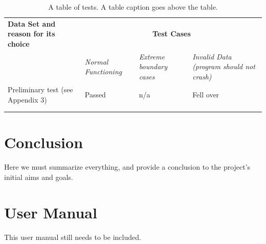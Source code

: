 \documentclass[11pt,a4paper]{article}
\begin{document}
\begin{table}[h!]
    \centering
    \begin{tabular}[t]{|p{5.5cm}|p{3cm}|p{3cm}|p{3cm}|} \hline \textbf{Data Set
        and reason for its choice} & \multicolumn{3}{c|}{\textbf{Test Cases}}\\
        \cline{2-4} & \emph{Normal Functioning} & \emph{Extreme boundary cases} &
        \emph{Invalid Data (program should not crash)} \\ \hline Preliminary test
        (see Appendix 3) & Passed & n/a & Fell over \\\hline &&&\\ \hline
                         &&&\\ \hline
    \end{tabular}
    \caption{A table of tests. A table caption goes above the table.}
    \label{tab:tests}
\end{table}

\section{Conclusion}
\label{s:conclusion}
Here we must summarize everything, and provide a conclusion to the project's
initial aims and goals.
\appendix
\section{User Manual}
\label{s:user-manual}
This user manual still needs to be included.
\end{document}
